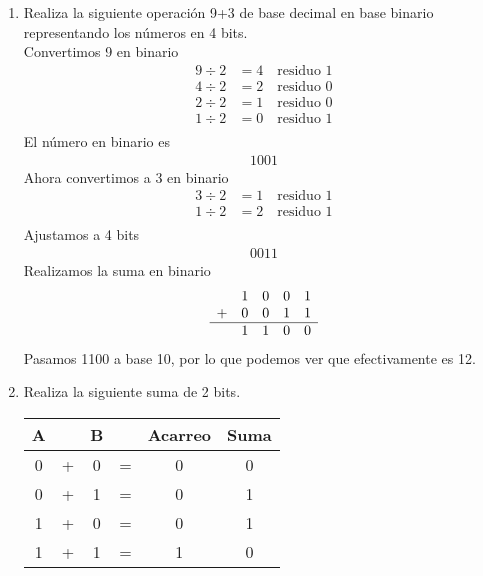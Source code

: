 \documentclass{article}
\begin{document}
\begin{enumerate}
    \item Realiza la siguiente operación 9+3 de base decimal en base binario representando los números en 4 bits. \\
    Convertimos 9 en binario
    \begin{align*}
    9 \div 2 &= 4 \quad \text{residuo } 1 \\
    4 \div 2 &= 2 \quad \text{residuo } 0 \\
    2 \div 2 &= 1 \quad \text{residuo } 0 \\
    1 \div 2 &= 0 \quad \text{residuo } 1 \\
    \end{align*}
    El número en binario es
    \begin{align*}
        1001
    \end{align*}
    Ahora convertimos a 3 en binario
    \begin{align*}
    3 \div 2 &= 1 \quad \text{residuo } 1 \\
    1 \div 2 &= 2 \quad \text{residuo } 1 \\
    \end{align*}
    Ajustamos a 4 bits 
    \begin{align*}
        0011
    \end{align*}
    Realizamos la suma en binario
    \[\begin{array}{cccccc}
    & 1 & 0 & 0 & 1 \\
    + & 0 & 0 & 1 & 1 \\
    \hline
    & 1 & 1 & 0 & 0 \\
    \end{array}\]
    Pasamos 1100 a base 10, por lo que podemos ver que efectivamente es 12.

    \item Realiza la siguiente suma de 2 bits.
\begin{table}[h]
    \begin{center}
        \begin{tabular}{|c|c|c|c|c|c|} \hline
        A &  & B &  & Acarreo & Suma \\ \hline
        0 & + & 0 & = & 0 & 0 \\ \hline 
        0 & + & 1 & = & 0 & 1 \\ \hline 
        1 & + & 0 & = & 0 & 1 \\ \hline 
        1 & + & 1 & = & 1 & 0\\ \hline 
    \end{tabular}
    \end{center}
\end{table}


\end{enumerate}
\end{document}
